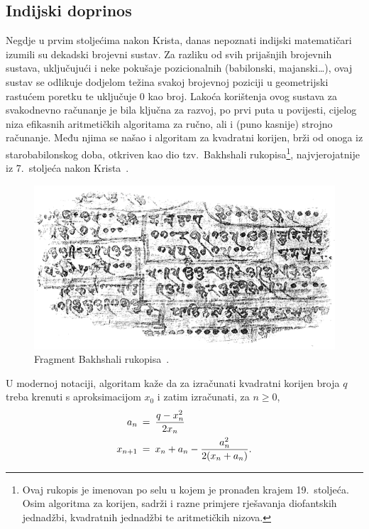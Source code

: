 \documentclass[12pt]{scrartcl}
\begin{document}
\subsection{Indijski doprinos}
Negdje u prvim stoljećima nakon Krista, danas nepoznati indijski matematičari izumili su dekadski brojevni sustav. Za razliku od svih prijašnjih brojevnih sustava,
uključujući i neke pokušaje pozicionalnih (babilonski, majanski\ldots), ovaj sustav se odlikuje dodjelom težina svakoj brojevnoj poziciji u geometrijski
rastućem poretku te uključuje $0$ kao broj. Lakoća korištenja ovog sustava za svakodnevno računanje je bila ključna za razvoj, po prvi puta
u povijesti, cijelog niza
efikasnih aritmetičkih algoritama za ručno, ali i (puno kasnije) strojno računanje. Među njima se našao i algoritam za kvadratni korijen, brži od onoga
iz starobabilonskog doba, otkriven kao dio tzv.\ Bakhshali rukopisa\footnote{Ovaj rukopis je imenovan po selu u kojem je pronađen krajem 19.\ stoljeća.
Osim algoritma za korijen, sadrži i razne primjere rješavanja diofantskih jednadžbi, kvadratnih jednadžbi te aritmetičkih nizova.},
najvjerojatnije iz 7.\ stoljeća nakon Krista~\cite{bakhshali}.

\begin{figure}
    \caption{Fragment Bakhshali rukopisa~\cite{bakhshali}.}
    \center
    \includegraphics[scale=0.5]{bakhshali}
\end{figure}

U modernoj notaciji, algoritam kaže da za izračunati kvadratni korijen broja $q$ treba krenuti s aproksimacijom $x_0$ i zatim izračunati,
za $n\geq 0$,
\begin{align}
    a_n\: &=\: \frac{q-x^2_n}{2x_n}\\
    x_{n+1}\: &=\:x_n + a_n - \frac{a^2_n}{2(x_n + a_n)}\text.%
\end{align}
\end{document}
